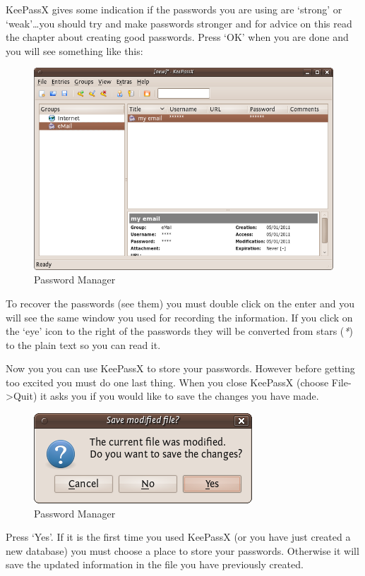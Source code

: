 KeePassX gives some indication if the passwords you are using are
`strong' or `weak'\ldots{}you should try and make passwords stronger and
for advice on this read the chapter about creating good passwords. Press
`OK' when you are done and you will see something like this:

\begin{figure}[htbp]
\centering
\includegraphics{mng_6.png}
\caption{Password Manager}
\end{figure}

To recover the passwords (see them) you must double click on the enter
and you will see the same window you used for recording the information.
If you click on the `eye' icon to the right of the passwords they will
be converted from stars (\emph{*}) to the plain text so you can read it.

Now you you can use KeePassX to store your passwords. However before
getting too excited you must do one last thing. When you close KeePassX
(choose File-\textgreater{}Quit) it asks you if you would like to save
the changes you have made.

\begin{figure}[htbp]
\centering
\includegraphics{mng_7.png}
\caption{Password Manager}
\end{figure}

Press `Yes'. If it is the first time you used KeePassX (or you have just
created a new database) you must choose a place to store your passwords.
Otherwise it will save the updated information in the file you have
previously created.

